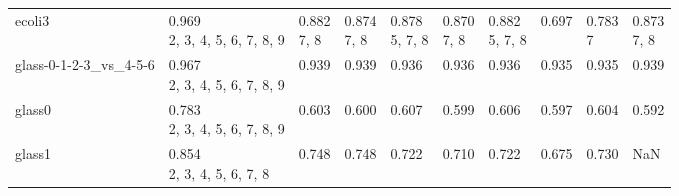 \begin{tabular}{llllllllll}
ecoli3                 &  \makecell{0.969 \\ \scriptsize{2, 3, 4, 5, 6, 7, 8, 9}} &     \makecell{0.882 \\ \scriptsize{7, 8}} &  \makecell{0.874 \\ \scriptsize{7, 8}} &  \makecell{0.878 \\ \scriptsize{5, 7, 8}} &     \makecell{0.870 \\ \scriptsize{7, 8}} &  \makecell{0.882 \\ \scriptsize{5, 7, 8}} &                  \makecell{0.697 \\ \scriptsize{}} &  \makecell{0.783 \\ \scriptsize{7}} &        \makecell{0.873 \\ \scriptsize{7, 8}} \\
glass-0-1-2-3_vs_4-5-6 &  \makecell{0.967 \\ \scriptsize{2, 3, 4, 5, 6, 7, 8, 9}} &         \makecell{0.939 \\ \scriptsize{}} &      \makecell{0.939 \\ \scriptsize{}} &         \makecell{0.936 \\ \scriptsize{}} &         \makecell{0.936 \\ \scriptsize{}} &         \makecell{0.936 \\ \scriptsize{}} &                  \makecell{0.935 \\ \scriptsize{}} &   \makecell{0.935 \\ \scriptsize{}} &            \makecell{0.939 \\ \scriptsize{}} \\
glass0                 &  \makecell{0.783 \\ \scriptsize{2, 3, 4, 5, 6, 7, 8, 9}} &         \makecell{0.603 \\ \scriptsize{}} &      \makecell{0.600 \\ \scriptsize{}} &         \makecell{0.607 \\ \scriptsize{}} &         \makecell{0.599 \\ \scriptsize{}} &         \makecell{0.606 \\ \scriptsize{}} &                  \makecell{0.597 \\ \scriptsize{}} &   \makecell{0.604 \\ \scriptsize{}} &            \makecell{0.592 \\ \scriptsize{}} \\
glass1                 &     \makecell{0.854 \\ \scriptsize{2, 3, 4, 5, 6, 7, 8}} &         \makecell{0.748 \\ \scriptsize{}} &      \makecell{0.748 \\ \scriptsize{}} &         \makecell{0.722 \\ \scriptsize{}} &         \makecell{0.710 \\ \scriptsize{}} &         \makecell{0.722 \\ \scriptsize{}} &                  \makecell{0.675 \\ \scriptsize{}} &   \makecell{0.730 \\ \scriptsize{}} &                                          NaN \\

\end{tabular}
